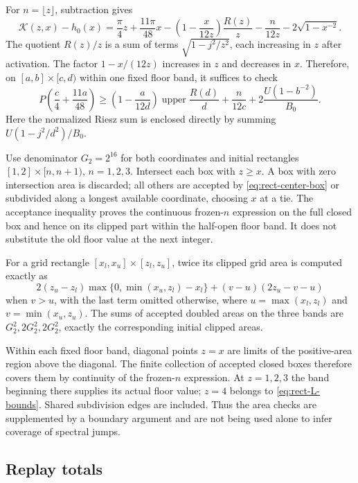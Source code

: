 \documentclass[11pt,reqno]{amsart}
\numberwithin{equation}{section}
\begin{document}
For $n=\lfloor z\rfloor$, subtraction gives
\begin{equation}\label{eq:rect-center-expanded}
 \mathcal K(z,x)-h_0(x)
 =\frac\pi4z+\frac{11\pi}{48}x
 -\left(1-\frac{x}{12z}\right)\frac{R(z)}z
 -\frac n{12z}-2\sqrt{1-x^{-2}}.
\end{equation}
The quotient $R(z)/z$ is a sum of terms
$\sqrt{1-j^2/z^2}$, each increasing in $z$ after activation.
The factor $1-x/(12z)$ increases in $z$ and decreases in $x$.
Therefore, on $[a,b]\times[c,d)$ within one fixed floor
band, it suffices to check
\begin{equation}\label{eq:rect-center-box}
 P\left(\frac c4+\frac{11a}{48}\right)
 \ge\left(1-\frac a{12d}\right)
       \operatorname{upper}\frac{R(d)}d
       +\frac n{12c}
       +2\frac{U(1-b^{-2})}{B_0}.
\end{equation}
Here the normalized Riesz sum is enclosed directly by summing
$U(1-j^2/d^2)/B_0$.

Use denominator $G_2=2^{16}$ for both coordinates and initial
rectangles $[1,2]\times[n,n+1)$, $n=1,2,3$. Intersect
each box with $z\ge x$. A box with zero intersection area is
discarded; all others are accepted by
\eqref{eq:rect-center-box} or subdivided along a longest
available coordinate, choosing $x$ at a tie.
The acceptance inequality proves the continuous frozen-$n$
expression on the full closed box and hence on its clipped
part within the half-open floor band. It does not substitute
the old floor value at the next integer.

For a grid rectangle $[x_l,x_u]\times[z_l,z_u]$, twice its
clipped grid area is computed exactly as
\[
 2(z_u-z_l)\max\{0,\min(x_u,z_l)-x_l\}
 +(v-u)(2z_u-v-u)
\]
when $v>u$, with the last term omitted otherwise, where
$u=\max(x_l,z_l)$ and $v=\min(x_u,z_u)$.
The sums of accepted doubled areas on the three bands are
$G_2^2,2G_2^2,2G_2^2$, exactly the corresponding initial
clipped areas.

Within each fixed floor band, diagonal points $z=x$ are
limits of the positive-area region above the diagonal.
The finite collection of accepted closed boxes therefore
covers them by continuity of the frozen-$n$ expression.
At $z=1,2,3$ the band beginning there supplies its actual
floor value; $z=4$ belongs to \eqref{eq:rect-L-bounds}.
Shared subdivision edges are included. Thus the area checks
are supplemented by a boundary argument and are not being
used alone to infer coverage of spectral jumps.

\subsection*{Replay totals}
\end{document}

